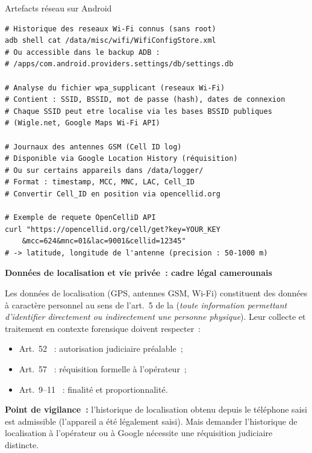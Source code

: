 \begin{boxoutils}{Artefacts réseau sur Android}
\begin{lstlisting}[language=bash_forensique]
# Historique des reseaux Wi-Fi connus (sans root)
adb shell cat /data/misc/wifi/WifiConfigStore.xml
# Ou accessible dans le backup ADB :
# /apps/com.android.providers.settings/db/settings.db

# Analyse du fichier wpa_supplicant (reseaux Wi-Fi)
# Contient : SSID, BSSID, mot de passe (hash), dates de connexion
# Chaque SSID peut etre localise via les bases BSSID publiques
# (Wigle.net, Google Maps Wi-Fi API)

# Journaux des antennes GSM (Cell ID log)
# Disponible via Google Location History (réquisition)
# Ou sur certains appareils dans /data/logger/
# Format : timestamp, MCC, MNC, LAC, Cell_ID
# Convertir Cell_ID en position via opencellid.org

# Exemple de requete OpenCelliD API
curl "https://opencellid.org/cell/get?key=YOUR_KEY
    &mcc=624&mnc=01&lac=9001&cellid=12345"
# -> latitude, longitude de l'antenne (precision : 50-1000 m)
\end{lstlisting}
\end{boxoutils}

\begin{boxjuris}
\textbf{Données de localisation et vie privée~: cadre légal camerounais}

Les données de localisation (GPS, antennes GSM, Wi-Fi) constituent des
données à caractère personnel au sens de l'art.~5 de la 
(\textit{toute information permettant d'identifier directement ou
indirectement une personne physique}). Leur collecte et traitement
en contexte forensique doivent respecter~:
\begin{itemize}
    \item Art.~52 ~: autorisation judiciaire préalable~;
    \item Art.~57 ~: réquisition formelle à l'opérateur~;
    \item Art.~9--11 ~: finalité et proportionnalité.
\end{itemize}
\textbf{Point de vigilance~:} l'historique de localisation obtenu depuis
le téléphone saisi est admissible (l'appareil a été légalement saisi).
Mais demander l'historique de localisation à l'opérateur ou à Google
nécessite une réquisition judiciaire distincte.
\end{boxjuris}

